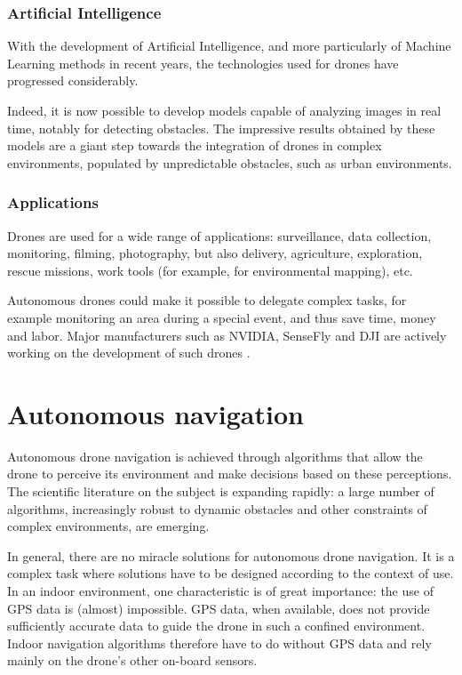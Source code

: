 \subsubsection{Artificial Intelligence}

With the development of Artificial Intelligence, and more particularly of Machine Learning methods in recent years, the technologies used for drones have progressed considerably.

Indeed, it is now possible to develop models capable of analyzing images in real time, notably for detecting obstacles. The impressive results obtained by these models are a giant step towards the integration of drones in complex environments, populated by unpredictable obstacles, such as urban environments.

\subsubsection{Applications}

Drones are used for a wide range of applications: surveillance, data collection, monitoring, filming, photography, but also delivery, agriculture, exploration, rescue missions, work tools (for example, for environmental mapping), etc.

Autonomous drones could make it possible to delegate complex tasks, for example monitoring an area during a special event, and thus save time, money and labor. Major manufacturers such as NVIDIA, SenseFly and DJI are actively working on the development of such drones \cite{nvidia2021autonomousuav, sensefly2021drones, dji2021autonomousuav}.

\section{Autonomous navigation}

Autonomous drone navigation is achieved through algorithms that allow the drone to perceive its environment and make decisions based on these perceptions. The scientific literature on the subject is expanding rapidly: a large number of algorithms, increasingly robust to dynamic obstacles and other constraints of complex environments, are emerging.

In general, there are no miracle solutions for autonomous drone navigation. It is a complex task where solutions have to be designed according to the context of use. In an indoor environment, one characteristic is of great importance: the use of GPS data is (almost) impossible. GPS data, when available, does not provide sufficiently accurate data to guide the drone in such a confined environment. Indoor navigation algorithms therefore have to do without GPS data and rely mainly on the drone's other on-board sensors.

